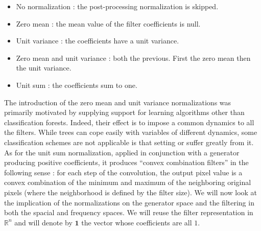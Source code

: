 \documentclass[a4paper]{report}
\begin{document}
			\begin{itemize}
				\item No normalization : the post-processing normalization is skipped.
				\item Zero mean : the mean value of the filter coefficients is null.
				\item Unit variance : the coefficients have a unit variance.
				\item Zero mean and unit variance : both the previous. First the zero mean then the unit variance.
				\item Unit sum : the coefficients sum to one.
			\end{itemize}
			
			The introduction of the zero mean and unit variance normalizations was primarily motivated by supplying support for learning algorithms other than classification forests. Indeed, their effect is to impose a common dynamics to all the filters. While trees can cope easily with variables of different dynamics, some classification schemes are not applicable is that setting or suffer greatly from it.
			As for the unit sum normalization, applied in conjunction with a generator producing positive coefficients, it produces ``convex combination filters'' in the following sense : for each step of the convolution, the output pixel value is a convex combination of the minimum and maximum of the neighboring original pixels (where the neighborhood is defined by the filter size).
			We will now look at the implication of the normalizations on the generator space and the filtering in both the spacial and frequency spaces. We will reuse the filter representation in $\mathbb{R}^n$ and will denote by $\textbf{1}$ the vector whose coefficients are all $1$.
			
\end{document}

